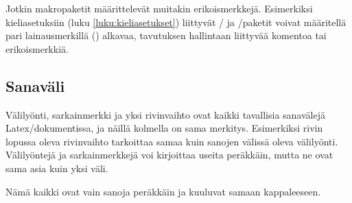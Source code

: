 
Jotkin makropaketit määrittelevät muitakin erikoismerkkejä. Esimerkiksi
kieli\-asetuksiin (luku \ref{luku:kieliasetukset}) liittyvät
\-/{} ja \-/paketit voivat
määritellä pari lainausmerkillä (\koodi{\textquotedbl}) alkavaa,
tavutuksen hallintaan liittyvää komentoa tai erikoismerkkiä.

\subsection{Sanaväli}
\label{luku:sanavali}

Välilyönti, sarkainmerkki ja yksi rivinvaihto ovat kaikki tavallisia
sanavälejä Latex\-/dokumentissa, ja näillä kolmella on sama merkitys.
Esimerkiksi rivin lopussa oleva rivinvaihto tarkoittaa samaa kuin
sanojen välissä oleva välilyönti. Välilyöntejä ja sarkainmerkkejä voi
kirjoittaa useita peräkkäin, mutta ne ovat sama asia kuin yksi väli.

\pagebreak[3]

\begin{koodilohkosis}
  Nämä      kaikki
       ovat            vain
  sanoja  peräkkäin  ja               kuuluvat
      samaan kappaleeseen.
\end{koodilohkosis}


